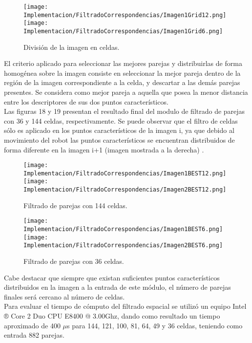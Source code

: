 \begin{figure}[H]
	
	\texttt{[image: Implementacion/FiltradoCorrespondencias/Imagen1Grid12.png]}
	\texttt{[image: Implementacion/FiltradoCorrespondencias/Imagen1Grid6.png]}
	\caption{División de la imagen en celdas.}
	\label{fig:my_label}
\end{figure}


El criterio aplicado para seleccionar las mejores parejas y distribuirlas de forma homogénea sobre la imagen  consiste en seleccionar la mejor pareja  dentro de la región de la imagen correspondiente a la celda, y descartar a las demás parejas presentes. Se considera como mejor pareja a aquella que posea la menor distancia entre los descriptores de sus dos puntos característicos.\\

Las figuras 18 y 19 presentan el resultado final del modulo de filtrado de parejas con 36 y 144 celdas, respectivamente. Se puede observar que el filtro de celdas sólo es aplicado en los puntos característicos de la imagen i, ya que debido al movimiento del robot las puntos característicos se encuentran distribuidos de forma diferente en la imagen i+1 (imagen mostrada a la derecha) . \\

\begin{figure}[H]
	
	\texttt{[image: Implementacion/FiltradoCorrespondencias/Imagen1BEST12.png]}
	\texttt{[image: Implementacion/FiltradoCorrespondencias/Imagen2BEST12.png]}
	\caption{Filtrado de parejas con 144 celdas.}
	\label{fig:my_label}
\end{figure}


\begin{figure}[H]
	
	\texttt{[image: Implementacion/FiltradoCorrespondencias/Imagen1BEST6.png]}
	\texttt{[image: Implementacion/FiltradoCorrespondencias/Imagen2BEST6.png]}
	\caption{Filtrado de parejas con 36 celdas.}
	\label{fig:my_label}
\end{figure}

Cabe destacar que siempre que existan suficientes puntos característicos distribuidos en la imagen a la entrada de este módulo, el número de parejas finales será cercano al número de celdas. \\

Para evaluar el tiempo de cómputo del filtrado espacial se utilizó un equipo Intel ® Core 2 Duo CPU E8400 @ 3.00Ghz, dando como resultado un tiempo aproximado de 400 $\mu$s para 144, 121, 100, 81, 64, 49 y 36 celdas, teniendo como entrada 882 parejas.




